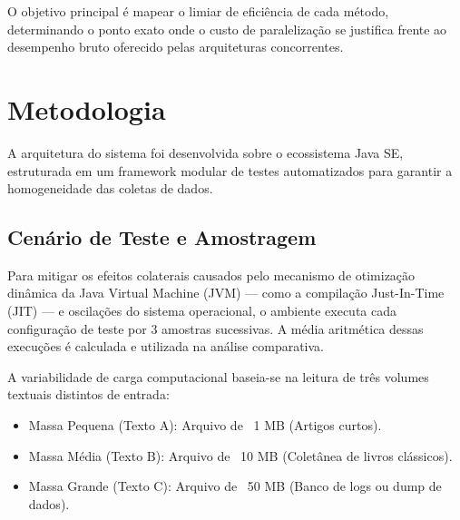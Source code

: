 \documentclass[11pt,a4paper]{article}
\begin{document}
O objetivo principal é mapear o limiar de eficiência de cada método, determinando o ponto exato onde o custo de paralelização se justifica frente ao desempenho bruto oferecido pelas arquiteturas concorrentes.

\section{Metodologia}
A arquitetura do sistema foi desenvolvida sobre o ecossistema Java SE, estruturada em um framework modular de testes automatizados para garantir a homogeneidade das coletas de dados.

\subsection{Cenário de Teste e Amostragem}
Para mitigar os efeitos colaterais causados pelo mecanismo de otimização dinâmica da Java Virtual Machine (JVM) — como a compilação Just-In-Time (JIT) — e oscilações do sistema operacional, o ambiente executa cada configuração de teste por 3 amostras sucessivas. A média aritmética dessas execuções é calculada e utilizada na análise comparativa.

A variabilidade de carga computacional baseia-se na leitura de três volumes textuais distintos de entrada:
\begin{itemize}
	\item Massa Pequena (Texto A): Arquivo de ~1 MB (Artigos curtos).
	\item Massa Média (Texto B): Arquivo de ~10 MB (Coletânea de livros clássicos).
	\item Massa Grande (Texto C): Arquivo de ~50 MB (Banco de logs ou dump de dados).
\end{itemize}
\end{document}
